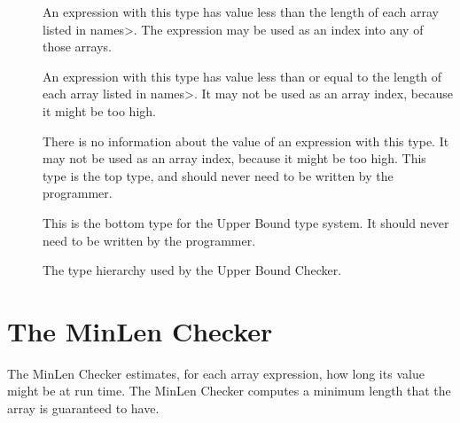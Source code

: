 \begin{description}
\item[]
  An expression with this type
  has value less than the length of each array listed in \<names>.
  The expression may be used as an index into any of those arrays.
\item[]
  An expression with this type
  has value less than or equal to the length of each array listed in \<names>.
  It may not be used as an array index, because it might be too high.
\item[]
  There is no information about the value of an expression with this type.
  It may not be used as an array index, because it might be too high.
  This type is the top type, and should never need to be written by the
  programmer.
\item[]
  This is the bottom type for the Upper Bound type system. It should
  never need to be written by the programmer.
  \end{description}

\begin{figure}
  \caption{The type hierarchy used by the Upper Bound Checker.}
  \label{fig-upperbound-types}
\end{figure}



\section{The MinLen Checker\label{index-minlen}}

The MinLen Checker estimates, for each array expression, how long its value
might be at run time.  The MinLen Checker computes a minimum length that
the array is guaranteed to have.

